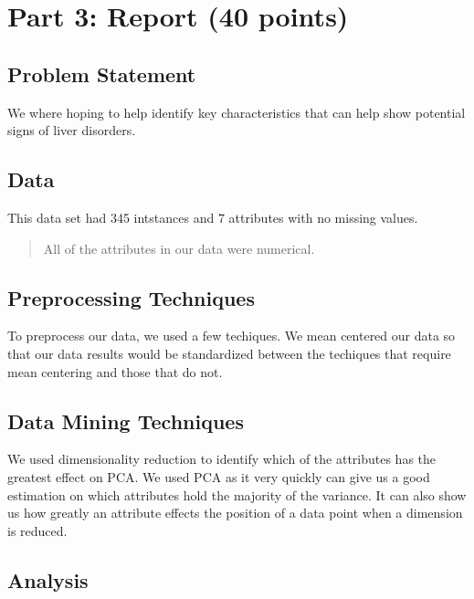 \documentclass[11pt]{article}
\begin{document}
    \hypertarget{part-3-report-40-points}{%
\section*{Part 3: Report (40 points)}\label{part-3-report-40-points}}

    \hypertarget{problem-statement}{%
\subsection*{Problem Statement}\label{problem-statement}}

    We where hoping to help identify key characteristics that can help show
potential signs of liver disorders.

    \hypertarget{data}{%
\subsection*{Data}\label{data}}

    This data set had 345 intstances and 7 attributes with no missing
values.

\begin{quote}
All of the attributes in our data were numerical.
\end{quote}

    \hypertarget{preprocessing-techniques}{%
\subsection*{Preprocessing Techniques}\label{preprocessing-techniques}}

    To preprocess our data, we used a few techiques. We mean centered our
data so that our data results would be standardized between the
techiques that require mean centering and those that do not.

    \hypertarget{data-mining-techniques}{%
\subsection*{Data Mining Techniques}\label{data-mining-techniques}}

    We used dimensionality reduction to identify which of the attributes has
the greatest effect on PCA. We used PCA as it very quickly can give us a
good estimation on which attributes hold the majority of the variance.
It can also show us how greatly an attribute effects the position of a
data point when a dimension is reduced.

    \hypertarget{analysis}{%
\subsection*{Analysis}\label{analysis}}
\end{document}
